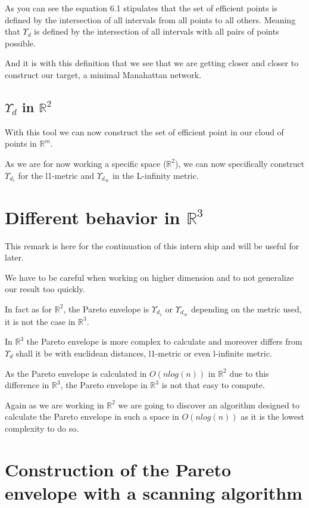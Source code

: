 As you can see the equation 6.1 stipulates that the set of efficient points is defined by the intersection of all intervals from all points to all others. Meaning that $\Upsilon_d$ is defined by the intersection of all intervals with all pairs of points possible.

And it is with this definition that we see that we are getting closer and closer to construct our target, a minimal Manahattan network.

\subsection{$\Upsilon_d$ in $\mathbb{R}^2$}%
With this tool we can now construct the set of efficient point in our cloud of points in $\mathbb{R}^m$.

As we are for now working a specific space ($\mathbb{R}^2$), we can now specifically construct $\Upsilon_{d_1}$ for the l1-metric and $\Upsilon_{d_{\infty}}$ in the L-infinity metric.

\section{Different behavior in $\mathbb{R}^3$}%
This remark is here for the continuation of this intern ship and will be useful for later. 

We have to be careful when working on higher dimension and to not generalize our result too quickly.

In fact as for $\mathbb{R}^2$, the Pareto envelope is $\Upsilon_{d_1}$ or $\Upsilon_{d_\infty}$ depending on the metric used, it is not the case in $\mathbb{R}^3$.

In $\mathbb{R}^3$ the Pareto envelope is more complex to calculate and moreover differs from $\Upsilon_d$ shall it be with euclidean distances, l1-metric or even l-infinite metric.

As the Pareto envelope is calculated in $O(n log(n))$ in $\mathbb{R}^2$ due to this difference in $\mathbb{R}^3$, the Pareto envelope in $\mathbb{R}^3$ is not that easy to compute.

Again as we are working in $\mathbb{R}^2$ we are going to discover an algorithm designed to calculate the Pareto envelope in such a space in $O(nlog(n))$ as it is the lowest complexity to do so.

\section{Construction of the Pareto envelope with a scanning algorithm}%
